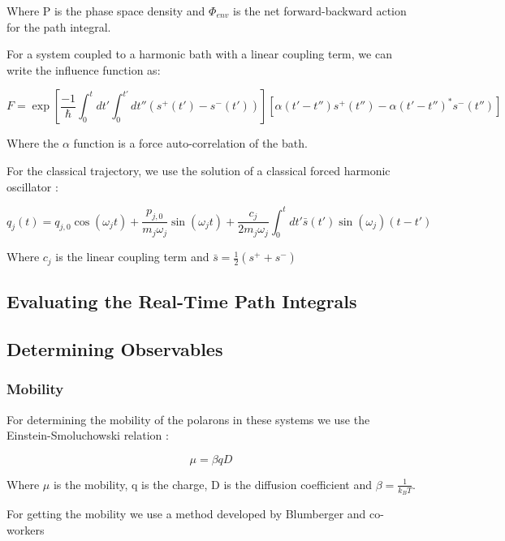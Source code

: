 Where P is the phase space density and $\Phi_{env}$ is the net forward-backward action for the path integral.

For a system coupled to a harmonic bath with a linear coupling term, we can write the influence function as: 

\begin{equation}
    F = \exp[\frac{-1}{\hbar} \int_0^{t} dt' \int_{0}^{t'} dt'' (s^+(t') - s^-(t'))][\alpha(t' - t'')s^+(t'') - \alpha(t' - t'')^{*}s^-(t'')]
\end{equation}

Where the $\alpha$ function is a force auto-correlation of the bath. 

For the classical trajectory, we use the solution of a classical forced harmonic oscillator :

\begin{equation}
    q_j(t) = q_{j,0}\cos(\omega_j t) + \frac{p_{j,0}}{m_j \omega_j} \sin(\omega_j t) + \frac{c_j}{2 m_j \omega_j} \int_0^{t} dt' \bar{s}(t')\sin(\omega_j)(t-t')
\end{equation}

Where $c_j$ is the linear coupling term and $\bar{s} = \frac{1}{2}(s^+ + s^-)$ 

\subsection{Evaluating the Real-Time Path Integrals}


\subsection{Determining Observables}

\subsubsection{Mobility}

For determining the mobility of the polarons in these systems we use the Einstein-Smoluchowski relation : 

\begin{equation}
    \mu = \beta qD
\end{equation}

Where $\mu$ is the mobility, q is the charge, D is the diffusion coefficient and $\beta = \frac{1}{k_B T}$. 

For getting the mobility we use a method developed by Blumberger and co-workers \cite{blumberger} 

